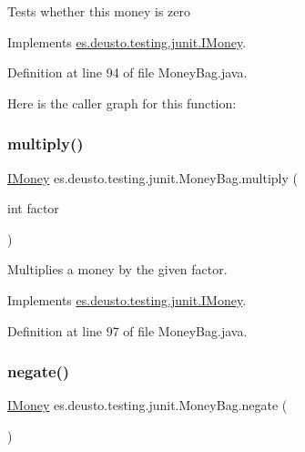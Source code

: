 Tests whether this money is zero 

Implements \mbox{\hyperlink{interfacees_1_1deusto_1_1testing_1_1junit_1_1_i_money_a166c39b6f931e49769580a04f8c73500}{es.\+deusto.\+testing.\+junit.\+I\+Money}}.



Definition at line 94 of file Money\+Bag.\+java.

Here is the caller graph for this function\+:
\mbox{\label{classes_1_1deusto_1_1testing_1_1junit_1_1_money_bag_aa20ce4cc70c2ba0bc9a5ccb96635d506}} 
\subsubsection{\texorpdfstring{multiply()}{multiply()}}
{\footnotesize\ttfamily \mbox{\hyperlink{interfacees_1_1deusto_1_1testing_1_1junit_1_1_i_money}{I\+Money}} es.\+deusto.\+testing.\+junit.\+Money\+Bag.\+multiply (\begin{DoxyParamCaption}\item[{int}]{factor }\end{DoxyParamCaption})}

Multiplies a money by the given factor. 

Implements \mbox{\hyperlink{interfacees_1_1deusto_1_1testing_1_1junit_1_1_i_money_a09154f9713133d4734f72d6a20081209}{es.\+deusto.\+testing.\+junit.\+I\+Money}}.



Definition at line 97 of file Money\+Bag.\+java.

\mbox{\label{classes_1_1deusto_1_1testing_1_1junit_1_1_money_bag_abf06bf97e548f95038756608fe0c8351}} 
\subsubsection{\texorpdfstring{negate()}{negate()}}
{\footnotesize\ttfamily \mbox{\hyperlink{interfacees_1_1deusto_1_1testing_1_1junit_1_1_i_money}{I\+Money}} es.\+deusto.\+testing.\+junit.\+Money\+Bag.\+negate (\begin{DoxyParamCaption}{ }\end{DoxyParamCaption})}

